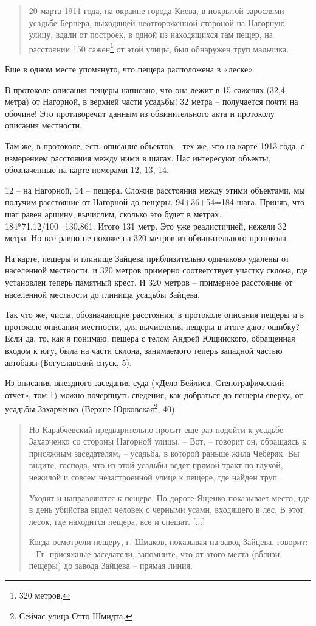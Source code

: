 \begin{quotation} 
20 марта 1911 года, на окраине города Киева, в покрытой зарослями усадьбе Бернера, выходящей  неотгороженной стороной на Нагорную улицу, вдали от построек, в одной из находящихся там пещер, на расстоянии 150 сажен\footnote{320 метров.} от этой улицы, был обнаружен труп мальчика.
\end{quotation} 

Еще в одном месте упомянуто, что пещера расположена в «леске».

В протоколе описания пещеры написано, что она лежит в 15 саженях (32,4 метра) от Нагорной, в верхней части усадьбы! 32 метра – получается почти на обочине! Это противоречит данным из обвинительного акта и протоколу описания местности.

Там же, в протоколе, есть описание объектов – тех же, что на карте 1913 года, с измерением расстояния между ними в шагах. Нас интересуют объекты, обозначенные на карте номерами 12, 13, 14.

12 – на Нагорной, 14 – пещера. Сложив расстояния между этими объектами, мы получим расстояние от Нагорной до пещеры. 94+36+54=184 шага. Приняв, что шаг равен аршину, вычислим, сколько это будет в метрах. 184*71,12/100=130,861. Итого 131 метр. Это уже реалистичней, нежели 32 метра. Но все равно не похоже на 320 метров из обвинительного протокола. 

На карте, пещеры и глинище Зайцева приблизительно одинаково удалены от населенной местности, и 320 метров примерно соответствует участку склона, где установлен теперь памятный крест. И 320 метров – примерное расстояние от населенной местности до глинища усадьбы Зайцева. 

Так что же, числа, обозначающие расстояния, в протоколе описания пещеры и в протоколе описания местности, для вычисления пещеры в итоге дают ошибку? Если да, то, как я понимаю, пещера с телом Андрей Ющинского, обращенная входом к югу, была на части склона, занимаемого теперь западной частью автобазы (Богуславский спуск, 5). 

Из описания выездного заседания суда («Дело Бейлиса. Стенографический отчет», том 1) можно почерпнуть сведения, как добраться до пещеры сверху, от усадьбы Захарченко (Верхне-Юрковская\footnote{Сейчас улица Отто Шмидта.}, 40):

\begin{quotation}
Но Карабчевский предварительно просит еще раз подойти к усадьбе Захарченко со стороны Нагорной улицы.
   – Вот, – говорит он, обращаясь к присяжным заседателям, – усадьба, в которой раньше жила Чеберяк. Вы видите, господа, что из этой усадьбы ведет прямой тракт по глухой, нежилой и совсем незастроенной улице к пещере, где найден труп.

Уходят и направляются к пещере. По дороге Ященко показывает место, где в день убийства видел человек с черными усами, входящего в лес. В этот лесок, где находится пещера, все и спешат. [...]

Когда осмотрели пещеру, г. Шмаков, показывая на завод Зайцева, говорит:
 – Гг. присяжные заседатели, запомните, что от этого места (вблизи пещеры) до завода Зайцева – прямая линия.
\end{quotation}


